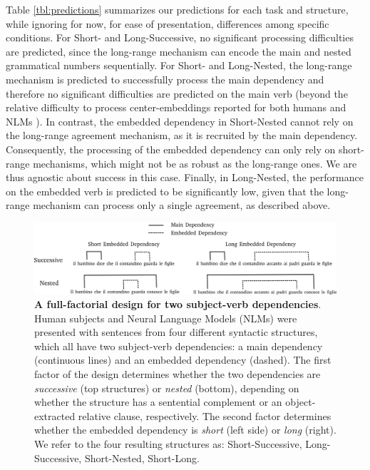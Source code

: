 Table \ref{tbl:predictions} summarizes our predictions for each task and structure, while ignoring for now, for ease of presentation, differences among specific conditions. 
For Short- and Long-Successive, no significant processing difficulties are predicted, since the long-range mechanism can encode the main and nested grammatical numbers sequentially. 
For Short- and Long-Nested, the long-range mechanism is predicted to successfully process the main dependency and therefore no significant difficulties are predicted on the main verb (beyond the relative difficulty to process center-embeddings reported for both humans \citep{traxler2002processing} and NLMs \citep{marvin2018targeted}). In contrast, the embedded dependency in Short-Nested cannot rely on the long-range agreement mechanism, as it is recruited by the main dependency. Consequently, the processing of the embedded dependency can only rely on short-range mechanisms, which might not be as robust as the long-range ones. We are thus agnostic about success in this case. Finally, in Long-Nested, the performance on the embedded verb is predicted to be significantly low, given that the long-range mechanism can process only a single agreement, as described above.  




\begin{figure}
    \centering
    \includegraphics[width=\textwidth]{figures/design.png}
    \caption{\textbf{A full-factorial design for two subject-verb dependencies}. Human subjects and Neural Language Models (NLMs) were presented with sentences from four different syntactic structures, which all have two subject-verb dependencies: a main dependency (continuous lines) and an embedded dependency (dashed). The first factor of the design determines whether the two dependencies are \textit{successive} (top structures) or \textit{nested} (bottom), depending on whether the structure has a sentential complement or an object-extracted relative clause, respectively. The second factor determines whether the embedded dependency is \textit{short} (left side) or \textit{long} (right). We refer to the four resulting structures as: Short-Successive, Long-Successive, Short-Nested, Short-Long.}
    \label{fig:design}
\end{figure}

